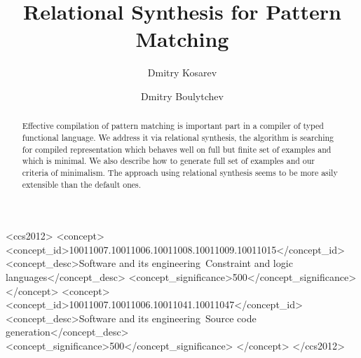 \documentclass[acmlarge]{acmart}
\begin{document}
\title[Relational Synthesis of Pattern Matching]{Relational Synthesis for Pattern Matching}    



\author{Dmitry Kosarev}

\author{Dmitry Boulytchev}




\begin{abstract}
Effective compilation of pattern matching is important part in a compiler of typed functional language.  We address it via relational synthesis, the algorithm is searching for compiled representation which behaves well on full but finite set of examples and which is minimal. We also describe how to generate full set of examples and our  criteria of minimalism. The approach using relational synthesis seems to be more asily extensible than the default ones.
\end{abstract}


\begin{CCSXML}
<ccs2012>
<concept>
<concept_id>10011007.10011006.10011008.10011009.10011015</concept_id>
<concept_desc>Software and its engineering~Constraint and logic languages</concept_desc>
<concept_significance>500</concept_significance>
</concept>
<concept>
<concept_id>10011007.10011006.10011041.10011047</concept_id>
<concept_desc>Software and its engineering~Source code generation</concept_desc>
<concept_significance>500</concept_significance>
</concept>
</ccs2012>
\end{CCSXML}

\end{document}
